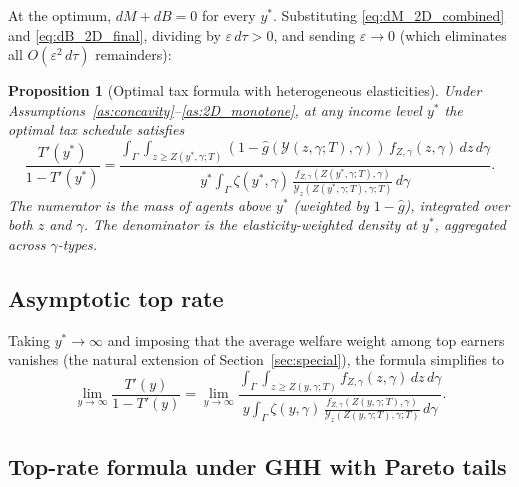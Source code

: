 \documentclass[12pt,a4paper]{article}
\theoremstyle{definition}
\theoremstyle{plain}
\newtheorem{proposition}{Proposition}[section]
\theoremstyle{remark}
\newcommand{\calY}{\mathcal{Y}}
\begin{document}
At the optimum, $dM + dB = 0$ for every $y^*$.  Substituting \eqref{eq:dM_2D_combined} and \eqref{eq:dB_2D_final}, dividing by $\varepsilon\,d\tau > 0$, and sending $\varepsilon \to 0$ (which eliminates all $O(\varepsilon^2\,d\tau)$ remainders):

\begin{proposition}[Optimal tax formula with heterogeneous elasticities]
\label{prop:2D_FOC}
Under Assumptions~\ref{as:concavity}--\ref{as:2D_monotone}, at any income level $y^*$ the optimal tax schedule satisfies
\begin{equation}
\label{eq:FOC_2D_tax}
  \frac{T'(y^*)}{1-T'(y^*)}
  = \frac{\displaystyle\int_{\Gamma}\int_{z \geq Z(y^*,\gamma;T)}
    (1 - \hat{g}(\calY(z,\gamma;T),\gamma))\,f_{Z,\gamma}(z,\gamma)\,dz\,d\gamma}
  {\displaystyle y^*\int_{\Gamma} \zeta(y^*,\gamma)\,
    \frac{f_{Z,\gamma}(Z(y^*,\gamma;T),\gamma)}{\calY_z(Z(y^*,\gamma;T),\gamma;T)}\,d\gamma}.
\end{equation}
The numerator is the mass of agents above $y^*$ (weighted by $1 - \hat{g}$), integrated over both $z$ and $\gamma$.  The denominator is the elasticity-weighted density at $y^*$, aggregated across $\gamma$-types.
\end{proposition}

\subsection{Asymptotic top rate}
\label{sec:2D_top}

Taking $y^* \to \infty$ and imposing that the average welfare weight among top earners vanishes (the natural extension of Section~\ref{sec:special}), the formula simplifies to
\begin{equation}
\label{eq:FOC_top_2D}
  \lim_{y \to \infty}\frac{T'(y)}{1-T'(y)}
  = \lim_{y \to \infty}\frac{\displaystyle\int_{\Gamma}\int_{z \geq Z(y,\gamma;T)} f_{Z,\gamma}(z,\gamma)\,dz\,d\gamma}
  {\displaystyle y\int_{\Gamma} \zeta(y,\gamma)\,\frac{f_{Z,\gamma}(Z(y,\gamma;T),\gamma)}{\calY_z(Z(y,\gamma;T),\gamma;T)}\,d\gamma}.
\end{equation}

\subsection{Top-rate formula under GHH with Pareto tails}
\label{sec:2D_GHH_top}
\end{document}
